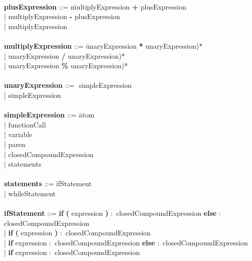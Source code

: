 \begin{tabbing}
\\ 
{\bf plusExpression}              ::= \=multiplyExpression \textbf{+} plusExpression\\
                                      \>| multiplyExpression \textbf{-} plusExpression\\
                                      \>| multiplyExpression\\
\\
{\bf multiplyExpression}          ::= \=unaryExpression \textbf{*} unaryExpression)*\\
                                      \>| unaryExpression \textbf{/} unaryExpression)*\\
                                      \>| unaryExpression \textbf{\%} unaryExpression)*\\
\\
{\bf unaryExpression}             ::= \=\textbf{$\!$} simpleExpression\\
                                      \>| simpleExpression\\ 
\\   
{\bf simpleExpression}            ::= \=atom\\
                                      \>| functionCall\\
                                      \>| variable\\
                                      \>| paren\\
                                      \>| closedCompoundExpression\\
                                      \>| statements\\
\\
{\bf statements}                  ::= \=ifStatement\\
                                      \>| whileStatement\\
\\
{\bf ifStatement}                 ::= \=\textbf{if} \=\textbf{(} expression \textbf{)} $\colon$ closedCompoundExpression \textbf{else} $\colon$ closedCompoundExpression\\
                                      \>| \textbf{if} \textbf{(} expression \textbf{)} $\colon$ closedCompoundExpression\\
                                      \>| \textbf{if} expression $\colon$ closedCompoundExpression \textbf{else} $\colon$ closedCompoundExpression\\
                                      \>| \textbf{if} expression $\colon$ closedCompoundExpression\\

\end{tabbing}
